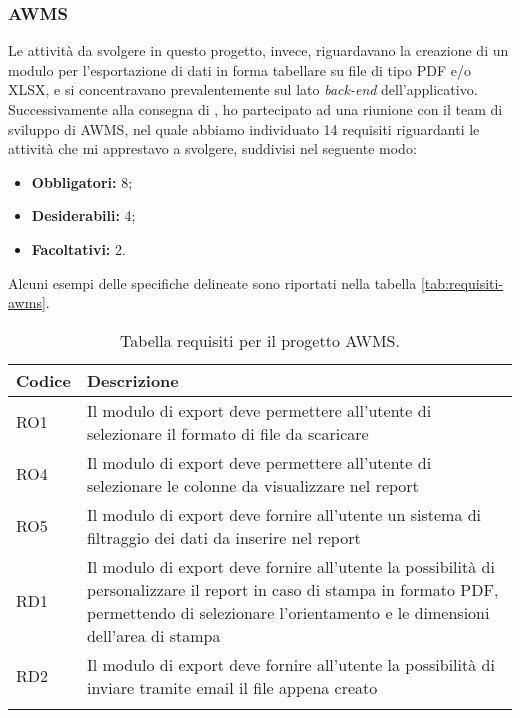 \subsubsection*{AWMS}
Le attività da svolgere in questo progetto, invece, riguardavano la creazione di un modulo per l'esportazione di dati in forma tabellare su file di tipo PDF e/o XLSX, e si concentravano prevalentemente sul lato \textit{back-end} dell'applicativo.
Successivamente alla consegna di \DS{}, ho partecipato ad una riunione con il team di sviluppo di AWMS, nel quale abbiamo individuato 14 requisiti riguardanti le attività che mi apprestavo a svolgere, suddivisi nel seguente modo:
\begin{itemize}
    \item \textbf{Obbligatori:} 8;
    \item \textbf{Desiderabili:} 4;
    \item \textbf{Facoltativi:} 2.
\end{itemize}
Alcuni esempi delle specifiche delineate sono riportati nella tabella \ref{tab:requisiti-awms}.

\begin{center}
	\renewcommand{\arraystretch}{1.5}
	\begin{longtable}{ | p{0.1\linewidth} | p{0.9\linewidth} |}	 
		\hline   
	    \rowcolor{header}\textbf{Codice}&\textbf{Descrizione}\\
		\hline    	
    	RO1 & Il modulo di export deve permettere all'utente di selezionare il formato di file da scaricare  \\
    	RO4 & Il modulo di export deve permettere all'utente di selezionare le colonne da visualizzare nel report \\
        RO5 & Il modulo di export deve fornire all'utente un sistema di filtraggio dei dati da inserire nel report \\
    	RD1 & Il modulo di export deve fornire all'utente la possibilità di personalizzare il report in caso di stampa in formato PDF, permettendo di selezionare l'orientamento e le dimensioni dell'area di stampa\\
    	RD2 & Il modulo di export deve fornire all'utente la possibilità di inviare tramite email il file appena creato\\
    	\hline
		\rowcolor{white}    	
    	\caption{Tabella requisiti per il progetto AWMS.}
	\end{longtable}
	\label{tab:requisiti-awms}
\end{center}

